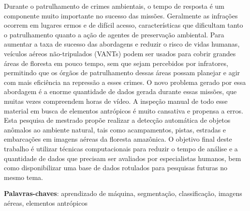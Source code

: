 \begin{resumo}
    Durante o patrulhamento de crimes ambientais, o tempo de resposta é um componente muito importante no sucesso das missões. Geralmente as infrações ocorrem em lugares ermos e de difícil acesso, características que dificultam tanto o patrulhamento quanto a ação de agentes de preservação ambiental. Para aumentar a taxa de sucesso das abordagens e reduzir o risco de vidas humanas, veículos aéreos não-tripulados (VANTs) podem ser usados para cobrir grandes áreas de floresta em pouco tempo, sem que sejam percebidos por infratores, permitindo que os órgãos de patrulhamento dessas áreas possam planejar e agir com mais eficiência na repressão a esses crimes. O novo problema gerado por essa abordagem é a enorme quantidade de dados gerada durante essas missões, que muitas vezes compreendem horas de vídeo. A inspeção manual de todo esse material em busca de elementos antrópicos é muito cansativa e propensa a erros. Esta pesquisa de mestrado propõe realizar a detecção automática de objetos anômalos ao ambiente natural, tais como acampamentos, pistas, estradas e embarcações em imagens aéreas da floresta amazônica. O objetivo final deste trabalho é utilizar técnicas computacionais para reduzir o tempo de análise e a quantidade de dados que precisam ser avaliados por especialistas humanos, bem como disponibilizar uma base de dados rotulados para pesquisas futuras no mesmo tema.

    \vspace{\onelineskip}
    \noindent
    \textbf{Palavras-chaves}: aprendizado de máquina, segmentação, classificação, imagens aéreas, elementos antrópicos
\end{resumo}

